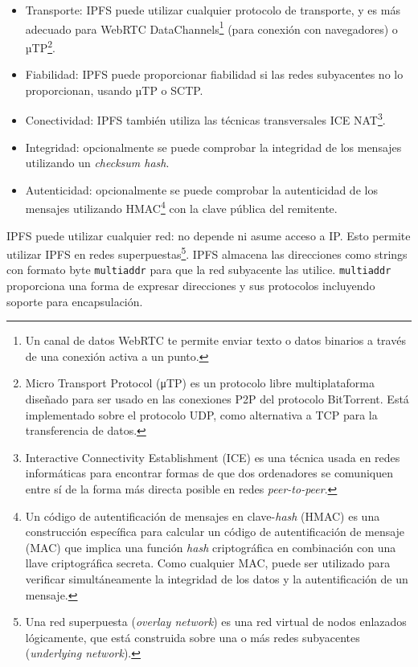 \documentclass[12pt]{article} %
\begin{document}
\begin{itemize}
	\item Transporte: IPFS puede utilizar cualquier protocolo de transporte, y es más adecuado para WebRTC DataChannels\footnote{Un canal de datos WebRTC te permite enviar texto o datos binarios a través de una conexión activa a un punto.\cite{WebRTC-data-channels}} (para conexión con navegadores) o µTP\footnote{Micro Transport Protocol (μTP) es un protocolo libre multiplataforma diseñado para ser usado en las conexiones P2P del protocolo BitTorrent. Está implementado sobre el protocolo UDP, como alternativa a TCP para la transferencia de datos.\cite{micro-transport-protocol}}.
	\item Fiabilidad: IPFS puede proporcionar fiabilidad si las redes subyacentes no lo proporcionan, usando µTP o SCTP.
	\item Conectividad: IPFS también utiliza las técnicas transversales ICE NAT\footnote{Interactive Connectivity Establishment (ICE) es una técnica usada en redes informáticas para encontrar formas de que dos ordenadores se comuniquen entre sí de la forma más directa posible en redes \textit{peer-to-peer}.\cite{interactive-connectivity-establishment}}.
	\item Integridad: opcionalmente se puede comprobar la integridad de los mensajes utilizando un \textit{checksum hash}.
	\item Autenticidad: opcionalmente se puede comprobar la autenticidad de los mensajes utilizando HMAC\footnote{Un código de autentificación de mensajes en clave-\textit{hash} (HMAC) es una construcción específica para calcular un código de autentificación de mensaje (MAC) que implica una función \textit{hash} criptográfica en combinación con una llave criptográfica secreta. Como cualquier MAC, puede ser utilizado para verificar simultáneamente la integridad de los datos y la autentificación de un mensaje.\cite{HMAC}} con la clave pública del remitente.
\end{itemize}

IPFS puede utilizar cualquier red: no depende ni asume acceso a IP. Esto permite utilizar IPFS en redes superpuestas\footnote{Una red superpuesta (\textit{overlay network}) es una red virtual de nodos enlazados lógicamente, que está construida sobre una o más redes subyacentes (\textit{underlying network}).\cite{red-superpuesta}}. IPFS almacena las direcciones como strings con formato byte \texttt{multiaddr} para que la red subyacente las utilice. \texttt{multiaddr} proporciona una forma de expresar direcciones y sus protocolos incluyendo soporte para encapsulación.
\end{document}
